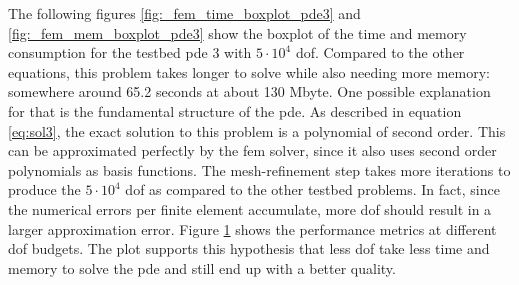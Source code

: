 \documentclass[./\jobname.tex]{subfiles}
\begin{document}
The following figures \ref{fig:_fem_time_boxplot_pde3} and \ref{fig:_fem_mem_boxplot_pde3} show the boxplot of the time and memory consumption for the testbed \gls{pde} 3 with $5 \cdot 10^4$ \gls{dof}. Compared to the other equations, this problem takes longer to solve while also needing more memory: somewhere around 65.2 seconds at about 130 Mbyte. One possible explanation for that is the fundamental structure of the \gls{pde}. As described in equation \eqref{eq:sol3}, the exact solution to this problem is a polynomial of second order. This can be approximated perfectly by the \gls{fem} solver, since it also uses second order polynomials as basis functions. The mesh-refinement step takes more iterations to produce the $5 \cdot 10^4$ \gls{dof} as compared to the other testbed problems. In fact, since the numerical errors per finite element accumulate, more \gls{dof} should result in a larger approximation error. Figure \ref{fig:_dof_sweep_pde3} shows the performance metrics at different \gls{dof} budgets. The plot supports this hypothesis that less \gls{dof} take less time and memory to solve the \gls{pde} and still end up with a better quality. 

\begin{figure}[H]
	\centering
	\noindent{}
	\label{fig:_dof_sweep_pde3}
\end{figure}
\end{document}
